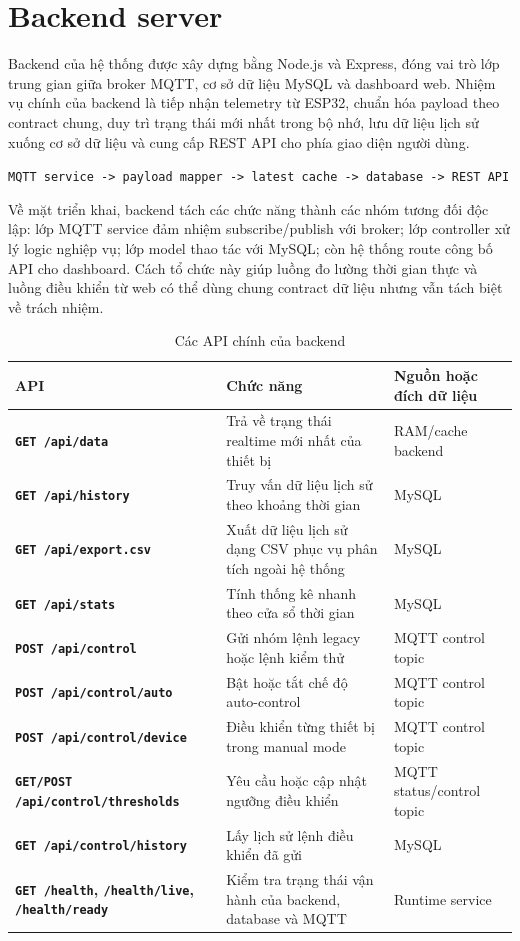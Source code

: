 \section{Backend server}

Backend của hệ thống được xây dựng bằng Node.js và Express, đóng vai trò lớp trung gian
giữa broker MQTT, cơ sở dữ liệu MySQL và dashboard web. Nhiệm vụ chính của backend là
tiếp nhận telemetry từ ESP32, chuẩn hóa payload theo contract chung, duy trì trạng thái
mới nhất trong bộ nhớ, lưu dữ liệu lịch sử xuống cơ sở dữ liệu và cung cấp REST API cho
phía giao diện người dùng.

\begin{center}
\texttt{MQTT service -> payload mapper -> latest cache -> database -> REST API}
\end{center}

Về mặt triển khai, backend tách các chức năng thành các nhóm tương đối độc lập: lớp
MQTT service đảm nhiệm subscribe/publish với broker; lớp controller xử lý logic nghiệp
vụ; lớp model thao tác với MySQL; còn hệ thống route công bố API cho dashboard. Cách tổ
chức này giúp luồng đo lường thời gian thực và luồng điều khiển từ web có thể dùng chung
contract dữ liệu nhưng vẫn tách biệt về trách nhiệm.

\begin{table}[H]
    \centering
    \caption{Các API chính của backend}
    \begin{tabularx}{\textwidth}{>{\bfseries}l X X}
        \toprule
        API & Chức năng & Nguồn hoặc đích dữ liệu \\
        \midrule
        \texttt{GET /api/data} & Trả về trạng thái realtime mới nhất của thiết bị & RAM/cache backend \\
        \texttt{GET /api/history} & Truy vấn dữ liệu lịch sử theo khoảng thời gian & MySQL \\
        \texttt{GET /api/export.csv} & Xuất dữ liệu lịch sử dạng CSV phục vụ phân tích ngoài hệ thống & MySQL \\
        \texttt{GET /api/stats} & Tính thống kê nhanh theo cửa sổ thời gian & MySQL \\
        \texttt{POST /api/control} & Gửi nhóm lệnh legacy hoặc lệnh kiểm thử & MQTT control topic \\
        \texttt{POST /api/control/auto} & Bật hoặc tắt chế độ auto-control & MQTT control topic \\
        \texttt{POST /api/control/device} & Điều khiển từng thiết bị trong manual mode & MQTT control topic \\
        \texttt{GET/POST /api/control/thresholds} & Yêu cầu hoặc cập nhật ngưỡng điều khiển & MQTT status/control topic \\
        \texttt{GET /api/control/history} & Lấy lịch sử lệnh điều khiển đã gửi & MySQL \\
        \texttt{GET /health}, \texttt{/health/live}, \texttt{/health/ready} & Kiểm tra trạng thái vận hành của backend, database và MQTT & Runtime service \\
        \bottomrule
    \end{tabularx}
\end{table}

